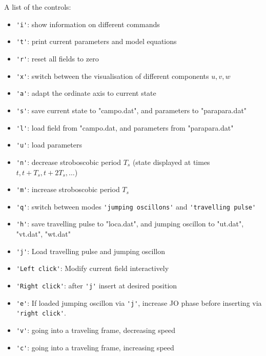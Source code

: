 \documentclass{article}
\begin{document}
A list of the controls:
\begin{itemize}
\item \verb!'i'!: show information on different commands
\item \verb!'t'!: print current parameters and model equations
\item \verb!'r'!: reset all fields to zero
\item \verb!'x'!: switch between the visualisation of different components $u,v,w$ 
\item \verb!'a'!: adapt the ordinate axis to current state 
\item \verb!'s'!: save current state to "campo.dat", and parameters to "parapara.dat"
\item \verb!'l'!: load field from "campo.dat, and parameters from "parapara.dat"
\item \verb!'u'!: load parameters
\item \verb!'n'!: decrease stroboscobic period $T_s$ (state displayed at times $t, t+T_s, t +2T_s,\dots$)
\item \verb!'m'!:  increase stroboscobic period $T_s$
\item \verb!'q'!:  switch between modes \verb!'jumping oscillons'! and  \verb!'travelling pulse'!
\item \verb!'h'!: save travelling pulse to "loca.dat", and jumping oscillon to "ut.dat", "vt.dat", "wt.dat"
\item \verb!'j'!: Load travelling pulse and jumping oscillon
\item \verb!'Left click'!: Modify current field interactively
\item \verb!'Right click'!: after \verb!'j'! insert at desired position
\item \verb!'e'!: If loaded jumping oscillon via \verb!'j'!, increase JO phase before inserting via \verb!'right click'!. 
\item \verb!'v'!: going into a traveling frame, decreasing speed
\item \verb!'c'!: going into a traveling frame, increasing speed

\end{itemize}
\end{document}
